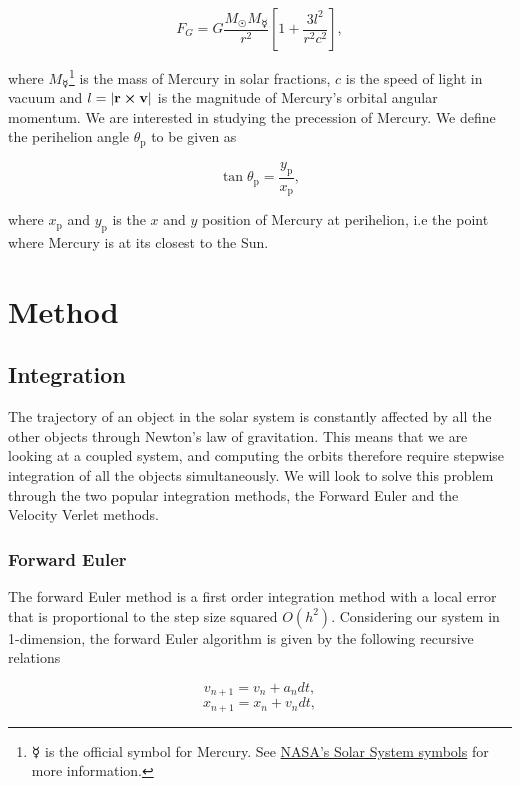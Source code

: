 \documentclass[a4paper, 10pt, reqno]{amsart}
\begin{document}
\begin{equation}\label{eq:13}
    F_G = G \frac{M_\Sun M_\Mercury}{r^2} \left[ 1 + \frac{3 l^2}{r^2 c^2}\right],
\end{equation}

\noindent where $M_\Mercury$\footnote{$\Mercury$ is the official symbol for Mercury. See \href{https://solarsystem.nasa.gov/resources/680/solar-system-symbols/}{\color{blue}NASA's Solar System symbols} for more information.} is the mass of Mercury in solar fractions, $c$ is the speed of light in vacuum and $l = \abs{\mathbf{r} \cross \mathbf{v}}$ is the magnitude of Mercury's orbital angular momentum. We are interested in studying the precession of Mercury. We define the perihelion angle $\theta_\text{p}$ to be given as

\begin{equation}\label{eq:14}
    \tan \theta_\text{p} = \frac{y_\text{p}}{x_\text{p}},
\end{equation}

\noindent where $x_\text{p}$ and $y_\text{p}$ is the $x$ and $y$ position of Mercury at perihelion, i.e the point where Mercury is at its closest to the Sun.

\section{Method}\label{sec:method}

\subsection{Integration} The trajectory of an object in the solar system is constantly affected by all the other objects through Newton's law of gravitation. This means that we are looking at a coupled system, and computing the orbits therefore require stepwise integration of all the objects simultaneously. We will look to solve this problem through the two popular integration methods, the Forward Euler and the Velocity Verlet methods.

\subsubsection{Forward Euler} The forward Euler method is a first order integration method with a local error that is proportional to the step size squared $O(h^2)$. Considering our system in 1-dimension, the forward Euler algorithm is given by the following recursive relations

\begin{equation}\label{eq:15}
    v_{n+1} = v_n + a_n dt,
\end{equation}
\begin{equation}\label{eq:16}
    x_{n+1} = x_n + v_n dt,
\end{equation}
\end{document}
